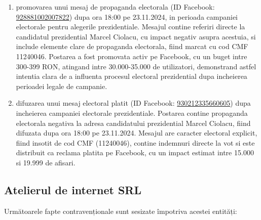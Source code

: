 \documentclass[a4paper,12pt]{article}
\begin{document}
\begin{enumerate}[leftmargin=*, label=\arabic*.)]
    \item promovarea unui mesaj de propaganda electorala (ID Facebook: \href{https://www.facebook.com/ads/library/?id=928881002007822}{928881002007822}) dupa ora 18:00 pe 23.11.2024, in perioada campaniei electorale pentru alegerile prezidentiale. Mesajul contine referiri directe la candidatul prezidential Marcel Ciolacu, cu impact negativ asupra acestuia, si include elemente clare de propaganda electorala, fiind marcat cu cod CMF 11240046. Postarea a fost promovata activ pe Facebook, cu un buget intre 300-399 RON, atingand intre 30.000-35.000 de utilizatori, demonstrand astfel intentia clara de a influenta procesul electoral prezidential dupa incheierea perioadei legale de campanie.
    \item difuzarea unui mesaj electoral platit (ID Facebook: \href{https://www.facebook.com/ads/library/?id=930212335660605}{930212335660605}) dupa incheierea campaniei electorale prezidentiale. Postarea contine propaganda electorala negativa la adresa candidatului prezidential Marcel Ciolacu, fiind difuzata dupa ora 18:00 pe 23.11.2024. Mesajul are caracter electoral explicit, fiind insotit de cod CMF (11240046), contine indemnuri directe la vot si este distribuit ca reclama platita pe Facebook, cu un impact estimat intre 15.000 si 19.999 de afisari.
\end{enumerate}

\vspace{0.5cm}

\subsection{Atelierul de internet SRL}
Următoarele fapte contravenționale sunt sesizate împotriva acestei entități:
\end{document}
